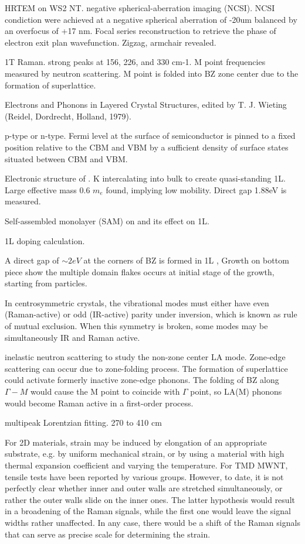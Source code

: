HRTEM on WS2 NT.\cite{Sadan2008} negative spherical-aberration imaging (NCSI). NCSI condiction were achieved at a negative spherical aberration of -20um balanced by an overfocus of +17 nm. Focal series reconstruction to retrieve the phase of electron exit plan wavefunction. Zigzag, armchair revealed.

1T  Raman. \cite{Yang1991} strong peaks at 156, 226, and 330 cm-1. M point frequencies measured by neutron scattering. M point is folded into BZ zone center due to the formation of superlattice.

Electrons and Phonons in Layered Crystal Structures, edited by T. J. Wieting (Reidel, Dordrecht, Holland, 1979).

 p-type or n-type.  Fermi level at the surface of semiconductor is pinned to a fixed position relative to the CBM and VBM by a sufficient density of surface states situated between CBM and VBM. \cite{Baglio1983}

Electronic structure of .\cite{Eknapakul2014} K intercalating into bulk to create quasi-standing 1L. Large effective mass 0.6 $m_e$ found, implying low mobility. Direct gap 1.88eV is measured.

Self-assembled monolayer (SAM) on  and its effect on  1L.\cite{Najmaei2014}

 1L doping calculation. \cite{Ma2011}



A direct gap of $\sim 2eV$ at the corners of BZ is formed in 1L , Growth on bottom piece show the multiple domain flakes occurs at initial stage of the growth, starting from  particles.


In centrosymmetric crystals, the vibrational modes must either have even (Raman-active) or odd (IR-active) parity under inversion, which is known as rule of mutual exclusion. When this symmetry is broken, some modes may be simultaneously IR and Raman active.

inelastic neutron scattering to study the non-zone center LA mode. Zone-edge scattering can occur due to zone-folding process. The formation of superlattice could activate formerly inactive zone-edge phonons. The folding of BZ along $\Gamma-M$ would cause the M point to coincide with $\Gamma$ point, so LA(M) phonons would become Raman active in a first-order process.

multipeak Lorentzian fitting. 270 to 410 cm

For 2D materials, strain may be induced by elongation of an appropriate substrate, e.g. by uniform mechanical strain, or by using a material with high thermal expansion coefficient and varying the temperature. For TMD MWNT, tensile tests have been reported by various groups. However, to date, it is not perfectly clear whether inner and outer walls are stretched simultaneously, or rather the outer walls slide on the inner ones. The latter hypothesis would result in a broadening of the Raman signals, while the first one would leave the signal widths rather unaffected. In any case, there would be a shift of the Raman signals that can serve as precise scale for determining the strain.

